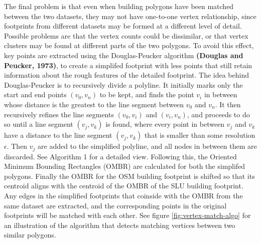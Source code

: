 \documentclass{kththesis}
\begin{document}
The final problem is that even when building polygons have been matched between the two datasets, they may not have one-to-one vertex relationship, since footprints from different datasets may be formed at a different level of detail.
Possible problems are that the vertex counts could be dissimilar, or that vertex clusters may be found at different parts of the two polygons.
To avoid this effect, key points are extracted using the Douglas-Peucker algorithm \textbf{(Douglas and Peucker, 1973)}, to create a simplifed footprint with less points that still retain information about the rough features of the detailed footprint.
The idea behind Douglas-Peucker is to recursively divide a polyline.
It initially marks only the start and end points $(v_0, v_n)$ to be kept, and finds the point $v_i$ in between whose distance is the greatest to the line segment between $v_0$ and $v_n$.
It then recursively refines the line segments $(v_0, v_i)$ and $(v_i, v_n)$, and proceeds to do so until a line segment $(v_j, v_k)$ is found, where every point in between $v_j$ and $v_k$ have a distance to the line segment $(v_j, v_k)$ that is smaller than some resolution $\epsilon$.
Then $v_j$ are added to the simplified polyline, and all nodes in between them are discarded.
See Algorithm 1 for a detailed view.
Following this, the Oriented Minimum Bounding Rectangles (OMBR) are calculated for both the simplifed polygons.
Finally the OMBR for the OSM building footprint is shifted so that its centroid aligns with the centroid of the OMBR of the SLU building footprint.
Any edges in the simplified footprints that coinside with the OMBR from the same dataset are extracted, and the corresponding points in the original footprints will be matched with each other.
See figure \ref{fig:vertex-match-algo} for an illustration of the algorithm that detects matching vertices between two similar polygons.
\end{document}
